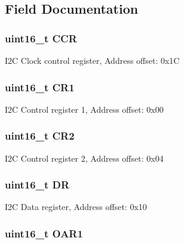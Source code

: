 \subsection{Field Documentation}
\hypertarget{struct_i2_c___type_def_a7ac198788f460fa6379bceecab79c5f7}{
\subsubsection[{C\-C\-R}]{ uint16\-\_\-t C\-C\-R}}\label{struct_i2_c___type_def_a7ac198788f460fa6379bceecab79c5f7}
I2\-C Clock control register, Address offset\-: 0x1\-C \hypertarget{struct_i2_c___type_def_a61400ce239355b62aa25c95fcc18a5e1}{
\subsubsection[{C\-R1}]{ uint16\-\_\-t C\-R1}}\label{struct_i2_c___type_def_a61400ce239355b62aa25c95fcc18a5e1}
I2\-C Control register 1, Address offset\-: 0x00 \hypertarget{struct_i2_c___type_def_a2a3e81bd118d1bc52d24a0b0772e6a0c}{
\subsubsection[{C\-R2}]{ uint16\-\_\-t C\-R2}}\label{struct_i2_c___type_def_a2a3e81bd118d1bc52d24a0b0772e6a0c}
I2\-C Control register 2, Address offset\-: 0x04 \hypertarget{struct_i2_c___type_def_a0a1acc0425516ff7969709d118b96a3b}{
\subsubsection[{D\-R}]{ uint16\-\_\-t D\-R}}\label{struct_i2_c___type_def_a0a1acc0425516ff7969709d118b96a3b}
I2\-C Data register, Address offset\-: 0x10 \hypertarget{struct_i2_c___type_def_aaab934113da0a8bcacd1ffa148046569}{
\subsubsection[{O\-A\-R1}]{ uint16\-\_\-t O\-A\-R1}}\label{struct_i2_c___type_def_aaab934113da0a8bcacd1ffa148046569}
